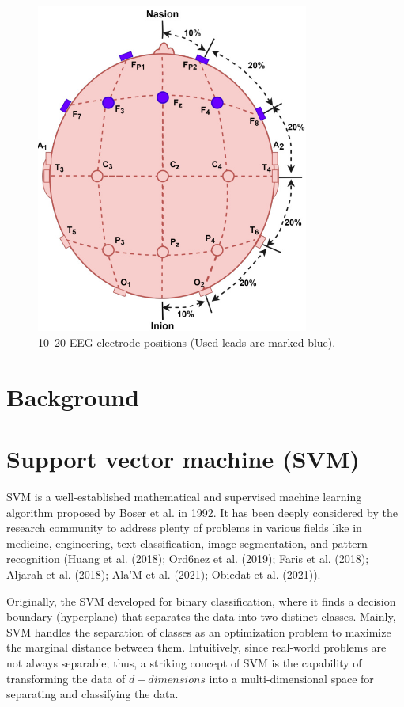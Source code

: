 \documentclass{article}
\begin{document}
\begin{figure}[htbp]
\centering
\includegraphics[width=0.8\textwidth]{images/b92d712fcf89518a10c69122e1cfe2f27d2373e33993274427d2dc4380668c54.jpg}
\caption{10–20 EEG electrode positions (Used leads are marked blue).}
\end{figure}


\section{Background}


\section{Support vector machine (SVM)}


SVM is a well-established mathematical and supervised machine learning algorithm proposed by Boser et al. in 1992. It has been deeply considered by the research community to address plenty of problems in various fields like in medicine, engineering, text classification, image segmentation, and pattern recognition (Huang et al. (2018); Ord6nez et al. (2019); Faris et al. (2018); Aljarah et al. (2018); Ala’M et al. (2021); Obiedat et al. (2021)).


Originally, the SVM developed for binary classification, where it finds a decision boundary (hyperplane) that separates the data into two distinct classes. Mainly, SVM handles the separation of classes as an optimization problem to maximize the marginal distance between them. Intuitively, since real-world problems are not always separable; thus, a striking concept of SVM is the capability of transforming the data of $d-d i m e n s i o n s$ into a multi-dimensional space for separating and classifying the data.
\end{document}
